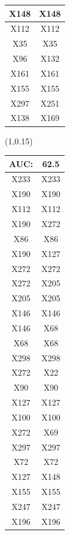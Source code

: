 \documentclass{beamer}
\newcommand{\boz}{\cellcolor{pathwaynode}}
\newcommand{\ghool}{\cellcolor{independentnode}}
\begin{document}
\begin{frame}[plain]
\begin{textblock*}{\paperwidth}
\begin{tabular}{| c c |}
\boz X148   &  \boz X148  \\ \hline
X112   &  X112  \\ \hline
X35   &  X35  \\ \hline
\ghool X96   &  X132  \\ \hline
X161   &  X161  \\ \hline
X155   &  X155  \\ \hline
X297   &  X251  \\ \hline
\boz X138   &  X169  \\ \hline
    \end{tabular}
    \hspace{.5em}
  \end{textblock*}
  \begin{textblock*}{\paperwidth}(1\textwidth,0.15\textheight)
    \raggedright 
    \tiny
    \begin{tabular}{| c c |}
      \hline
AUC: & 62.5 \\ \hline \hline
X233   &  X233  \\ \hline
\boz X190   &  \boz X190  \\ \hline
X112   &  X112  \\ \hline
\boz X190   &  \boz X272  \\ \hline
X86   &  X86  \\ \hline
\boz X190   &  X127  \\ \hline
\boz X272   &  \boz X272  \\ \hline
\boz X272   &  X205  \\ \hline
X205   &  X205  \\ \hline
X146   &  X146  \\ \hline
X146   &  X68  \\ \hline
X68   &  X68  \\ \hline
X298   &  X298  \\ \hline
\boz X272   &  \boz X22  \\ \hline
X90   &  X90  \\ \hline
X127   &  X127  \\ \hline
X100   &  X100  \\ \hline
\boz X272   &  X69  \\ \hline
X297   &  X297  \\ \hline
X72   &  X72  \\ \hline
X127   &  \boz X148  \\ \hline
X155   &  X155  \\ \hline
X247   &  X247  \\ \hline
X196   &  X196  \\ \hline

\end{tabular}
\end{textblock*}
\end{frame}
\end{document}
